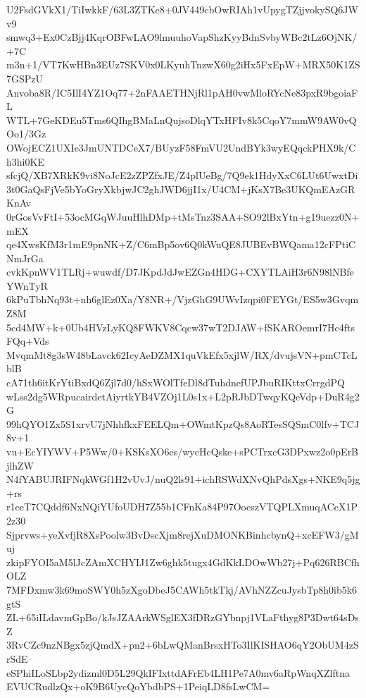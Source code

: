 U2FsdGVkX1/TiIwkkF/63L3ZTKe8+0JV449cbOwRIAh1vUpygTZjjvokySQ6JWv9
smwq3+Ex0CzBjj4KqrOBFwLAO9lmuuhoVapShzKyyBdnSvbyWBc2tLz6OjNK/+7C
m3n+1/VT7KwHBn3EUz7SKV0x0LKyuhTnzwX60g2iHx5FxEpW+MRX50K1ZS7GSPzU
Anvoba8R/IC5IlI4YZ1Oq77+2nFAAETHNjRl1pAH0vwMloRYcNe83pxR9bgoiaFL
WTL+7GeKDEu5Tms6QIhgBMaLnQujsoDlqYTxHFIv8k5CqoY7mmW9AW0vQOo1/3Gz
OWojECZ1UXIe3JmUNTDCeX7/BUyzF58FmVU2UndBYk3wyEQqckPHX9k/Ch3hi0KE
sfcjQ/XB7XRkK9vi8NoJcE2zZPZfxJE/Z4plUeBg/7Q9ek1HdyXxC6LUt6UwxtDi
3t0GaQsFjVe5bYoGryXkbjwJC2ghJWD6jjI1x/U4CM+jKsX7Be3UKQmEAzGRKnAv
0rGosVvFtI+53ocMGqWJuuHlhDMp+tMsTnz3SAA+SO92lBxYtn+g19uezz0N+mEX
qe4XwsKfM3r1mE9pnNK+Z/C6mBp5ov6Q0kWuQE8JUBEvBWQama12cFPtiCNmJrGa
cvkKpnWV1TLRj+wuwdf/D7JKpdJdJwEZGn4HDG+CXYTLAiH3r6N98lNBfeYWnTyR
6kPuTbhNq93t+nh6glEz0Xa/Y8NR+/VjzGhG9UWvIzqpi0FEYGt/ES5w3GvqmZ8M
5cd4MW+k+0Ub4HVzLyKQ8FWKV8Cqcw37wT2DJAW+fSKAROemrI7Hc4ftsFQq+Vds
MvqmMt8g3sW48bLavck62IcyAeDZMX1quVkEfx5xjlW/RX/dvujsVN+pmCTcLblB
cA71th6itKrYtiBxdQ6Zjl7d0/hSxWOlTfeDl8dTuhdnefUPJbuRIKttxCrrgdPQ
wLss2dg5WRpucairdetAiyrtkYB4VZOj1L0s1x+L2pRJbDTwqyKQeVdp+DuR4g2G
99hQYO1Zx5S1xrvU7jNhhfkxFEELQm+OWmtKpzQs8AoRTesSQSmC0lfv+TCJ8v+1
vu+EcYIYWV+P5Ww/0+KSKsXO6es/wycHcQske+sPCTrxcG3DPxwz2o0pErBjlhZW
N4fYABUJRIFNqkWGf1H2vUvJ/nuQ2ls91+ichRSWdXNvQhPdsXgs+NKE9q5jg+rs
r1eeT7CQddf6NxNQiYUfoUDH7Z55b1CFnKa84P97OocszVTQPLXmuqACeX1P2z30
Sjprvws+yeXvfjR8XsPoolw3BvDscXjm8rejXuDMONKBinhcbynQ+xcEFW3/gMuj
zkipFYOI5aM5lJcZAmXCHYIJ1Zw6ghk5tugx4GdKkLDOwWb27j+Pq626RBCfhOLZ
7MFDxmw3k69moSWY0h5zXgoDbeJ5CAWh5tkTkj/AVhNZZcuJysbTp8h0ib5k6gtS
ZL+65iILdavmGpBo/kJsJZAArkWSglEX3fDRzGYbnpj1VLaFthyg8P3Dwt64sDsZ
3RvCZc9nzNBgx5zjQmdX+pn2+6bLwQManBrsxHTo3IlKISHAO6qY2ObUM4zSrSdE
eSPhiILoSLbp2ydizml0D5L29QkIFIxttdAFrEb4LH1Pe7A0mv6aRpWnqXZlftna
EVUCRudlzQx+oK9B6UycQoYbdbPS+1PeiqLD8fsLwCM=
